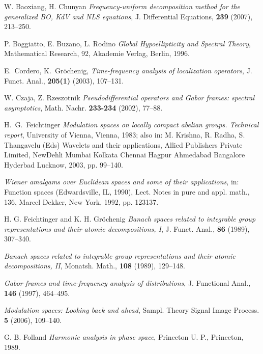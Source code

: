 \documentclass[12pt,a4paper,reqno]{amsart}
\numberwithin{equation}{section}
\numberwithin{thm}{section}
\theoremstyle{definition}
\theoremstyle{remark}
\begin{document}
\begin{thebibliography}{150}

W. Baoxiang, H. Chunyan \emph{Frequency-uniform decomposition
method for the generalized BO, KdV and NLS equations}, {J.
Differential Equations}, \textbf{239} (2007), 213--250.

 P. Boggiatto, E. Buzano, L. Rodino \emph{Global
Hypoellipticity and Spectral Theory},  Mathematical Research, 92,
Akademie Verlag, Berlin, 1996.

 E.~{C}ordero, K.~{G}r{\"o}chenig,
\emph{{T}ime-frequency analysis of localization operators},
 {J}. {F}unct. {A}nal., \textbf{205(1)} (2003), 107--131.

 W. Czaja, Z. Rzeszotnik
\emph{Pseudodifferential operators and Gabor frames: spectral
asymptotics}, {Math. Nachr.} \textbf{233-234} (2002), 77--88.

  H.~G.~Feichtinger \emph{Modulation spaces on locally
compact abelian groups. Technical report}, {University of
Vienna}, Vienna, 1983; also in: M. Krishna, R. Radha,
S. Thangavelu (Eds) Wavelets and their applications, Allied
Publishers Private Limited, NewDehli Mumbai Kolkata Chennai Hagpur
Ahmedabad Bangalore Hyderbad Lucknow, 2003, pp. 99--140.

 \bysame \emph{Wiener amalgams over Euclidean spaces and some of their applications},
in: Function spaces (Edwardsville, IL, 1990), Lect. Notes in pure and
appl. math., 136, Marcel Dekker, New York, 1992, pp. 123137.

  {H. G. Feichtinger and K. H. Gr{\"o}chenig}
\emph{Banach spaces related to integrable group representations and
their atomic decompositions, I}, J. Funct. Anal., \textbf{86}
(1989), 307--340.

 \bysame \emph{Banach spaces related to
integrable group representations and their atomic decompositions, II},
Monatsh. Math., \textbf{108} (1989), 129--148.

 \bysame \emph{Gabor frames and time-frequency
analysis of distributions}, {J. Functional
Anal.,} \textbf {146} (1997), 464--495.

 \bysame \emph{Modulation spaces: Looking back and ahead},
Sampl. Theory Signal Image Process. \textbf{5} (2006), 109--140.

  {G. B. Folland} \emph
{Harmonic analysis in phase space}, {Princeton U. P., Princeton},
1989.


\end{thebibliography}
\end{document}
